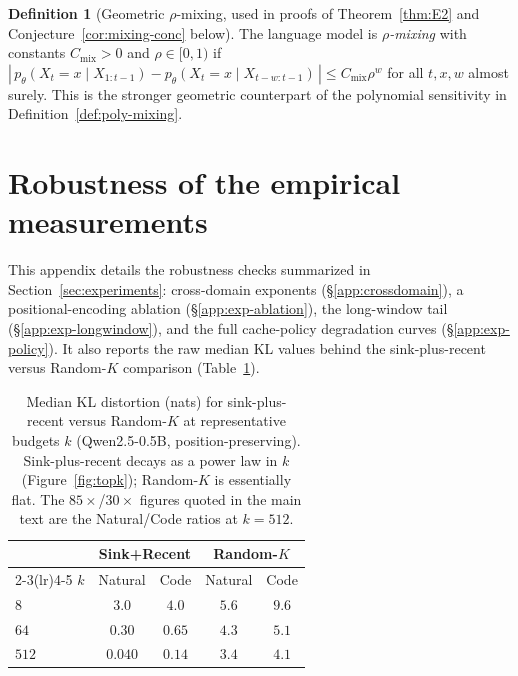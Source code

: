 \documentclass[11pt]{article}
\theoremstyle{plain}
\theoremstyle{definition}
\newtheorem{definition}[theorem]{Definition}
\theoremstyle{remark}
\begin{document}
\begin{definition}[Geometric $\rho$-mixing, used in
proofs of Theorem~\ref{thm:E2} and Conjecture~\ref{cor:mixing-conc}
below]\label{def:mixing}
The language model is \emph{$\rho$-mixing} with constants
$C_{\mathrm{mix}} > 0$ and $\rho \in [0, 1)$ if
$|\,p_\theta(X_t = x \mid X_{1:t-1}) - p_\theta(X_t = x \mid X_{t-w:t-1})\,|
\leq C_{\mathrm{mix}}\rho^w$ for all $t, x, w$ almost surely. This
is the stronger geometric counterpart of the polynomial
sensitivity in Definition~\ref{def:poly-mixing}.
\end{definition}

\section{Robustness of the empirical measurements}
\label{app:robustness}
This appendix details the robustness checks summarized in
Section~\ref{sec:experiments}: cross-domain exponents
(\S\ref{app:crossdomain}), a positional-encoding ablation
(\S\ref{app:exp-ablation}), the long-window tail
(\S\ref{app:exp-longwindow}), and the full cache-policy degradation
curves (\S\ref{app:exp-policy}). It also reports the raw
median KL values behind the sink-plus-recent versus Random-$K$
comparison (Table~\ref{tab:randomk}).

\begin{table}[ht]
\centering
\small
\setlength{\tabcolsep}{5pt}
\begin{tabular}{lcccc}
\toprule
& \multicolumn{2}{c}{Sink+Recent} & \multicolumn{2}{c}{Random-$K$} \\
\cmidrule(lr){2-3}\cmidrule(lr){4-5}
$k$ & Natural & Code & Natural & Code \\
\midrule
$8$   & $3.0$  & $4.0$  & $5.6$ & $9.6$ \\
$64$  & $0.30$ & $0.65$ & $4.3$ & $5.1$ \\
$512$ & $0.040$ & $0.14$ & $3.4$ & $4.1$ \\
\bottomrule
\end{tabular}
\caption{Median KL distortion (nats) for sink-plus-recent versus
Random-$K$ at representative budgets $k$ (Qwen2.5-0.5B,
position-preserving). Sink-plus-recent decays as a power law in $k$
(Figure~\ref{fig:topk}); Random-$K$ is essentially flat. The
$85\times$/$30\times$ figures quoted in the main text are the
Natural/Code ratios at $k = 512$.}
\label{tab:randomk}
\end{table}
\end{document}
